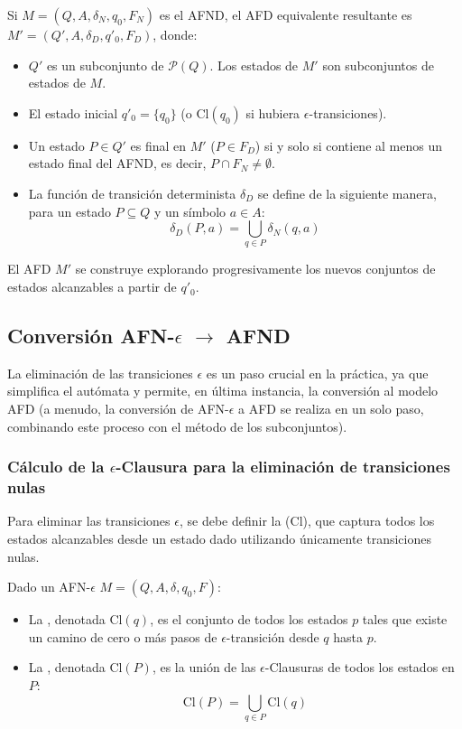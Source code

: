 Si $M = (Q, A, \delta_N, q_0, F_N)$ es el AFND, el AFD equivalente resultante es $M' = (Q', A, \delta_D, q'_0, F_D)$, donde:
\begin{itemize}
    \item $Q'$ es un subconjunto de $\mathcal{P}(Q)$. Los estados de $M'$ son subconjuntos de estados de $M$.
    \item El estado inicial $q'_0 = \{q_0\}$ (o $\text{Cl}(q_0)$ si hubiera $\epsilon$-transiciones).
    \item Un estado $P \in Q'$ es final en $M'$ ($P \in F_D$) si y solo si contiene al menos un estado final del AFND, es decir, $P \cap F_N \neq \emptyset$.
    \item La función de transición determinista $\delta_D$ se define de la siguiente manera, para un estado $P \subseteq Q$ y un símbolo $a \in A$:
    \[ \delta_D(P, a) = \bigcup_{q \in P} \delta_N(q, a) \]
\end{itemize}
El AFD $M'$ se construye explorando progresivamente los nuevos conjuntos de estados alcanzables a partir de $q'_0$.

\subsection{Conversión AFN-$\epsilon$ $\to$ AFND} %

La eliminación de las transiciones $\epsilon$ es un paso crucial en la práctica, ya que simplifica el autómata y permite, en última instancia, la conversión al modelo AFD (a menudo, la conversión de AFN-$\epsilon$ a AFD se realiza en un solo paso, combinando este proceso con el método de los subconjuntos).

\subsubsection{Cálculo de la $\epsilon$-Clausura para la eliminación de transiciones nulas}

Para eliminar las transiciones $\epsilon$, se debe definir la  ($\text{Cl}$), que captura todos los estados alcanzables desde un estado dado utilizando únicamente transiciones nulas.

\begin{definicion}
Dado un AFN-$\epsilon$ $M = (Q, A, \delta, q_0, F)$:
\begin{itemize}
    \item La , denotada $\text{Cl}(q)$, es el conjunto de todos los estados $p$ tales que existe un camino de cero o más pasos de $\epsilon$-transición desde $q$ hasta $p$.
    \item La , denotada $\text{Cl}(P)$, es la unión de las $\epsilon$-Clausuras de todos los estados en $P$:
    \[ \text{Cl}(P) = \bigcup_{q \in P} \text{Cl}(q) \]
\end{itemize}
\end{definicion}

